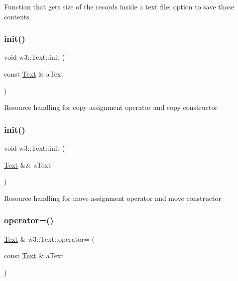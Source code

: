 Function that gets size of the records inside a text file; option to save those contents \mbox{\label{classw3_1_1Text_a0e6babcf3bf4a249883e9930964f1341}} 
\subsubsection{\texorpdfstring{init()}{init()}\hspace{0.1cm}{\footnotesize\ttfamily [1/2]}}
{\footnotesize\ttfamily void w3\+::\+Text\+::init (\begin{DoxyParamCaption}\item[{const \mbox{\hyperlink{classw3_1_1Text}{Text}} \&}]{a\+Text }\end{DoxyParamCaption})}

Resource handling for copy assignment operator and copy constructor \mbox{\label{classw3_1_1Text_a9e64abcee5332f985714f735f603a249}} 
\subsubsection{\texorpdfstring{init()}{init()}\hspace{0.1cm}{\footnotesize\ttfamily [2/2]}}
{\footnotesize\ttfamily void w3\+::\+Text\+::init (\begin{DoxyParamCaption}\item[{\mbox{\hyperlink{classw3_1_1Text}{Text}} \&\&}]{a\+Text }\end{DoxyParamCaption})}

Resource handling for move assignment operator and move constructor \mbox{\label{classw3_1_1Text_afedee168a1c51e33ff7ee514c4e644eb}} 
\subsubsection{\texorpdfstring{operator=()}{operator=()}\hspace{0.1cm}{\footnotesize\ttfamily [1/2]}}
{\footnotesize\ttfamily \mbox{\hyperlink{classw3_1_1Text}{Text}} \& w3\+::\+Text\+::operator= (\begin{DoxyParamCaption}\item[{const \mbox{\hyperlink{classw3_1_1Text}{Text}} \&}]{a\+Text }\end{DoxyParamCaption})}

